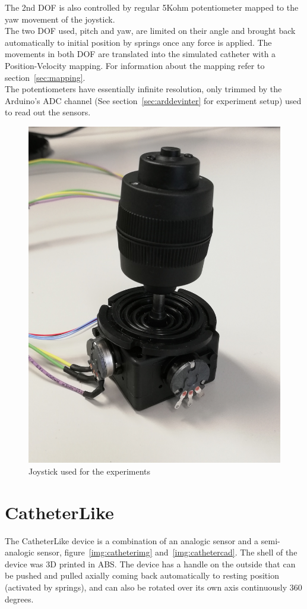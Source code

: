The 2nd DOF is also controlled by regular 5Kohm potentiometer mapped to the yaw movement of the joystick.\\

The two DOF used, pitch and yaw, are limited on their angle and brought back automatically to initial position by springs once any force is applied. The movements in both DOF are translated into the simulated catheter with a Position-Velocity mapping. For information about the mapping refer to section~\ref{sec:mapping}. \\

The potentiometers have essentially infinite resolution, only trimmed by the Arduino's ADC channel (See section~\ref{sec:arddevinter} for experiment setup) used to read out the sensors.\\

\begin{figure}[ht]
   \centering
   \includegraphics[width=0.6\linewidth]{img/joystick.jpg}
   \caption{Joystick used for the experiments}
   \label{img:joystickimg}
\end{figure}

\section{CatheterLike}\label{sec:catheterlike}
The CatheterLike device is a combination of an analogic sensor and a semi-analogic sensor, figure~\ref{img:catheterimg} and~\ref{img:cathetercad}. The shell of the device was 3D printed in ABS. The device has a handle on the outside that can be pushed and pulled axially coming back automatically to resting position (activated by springs), and can also be rotated over its own axis continuously 360 degrees.\\

